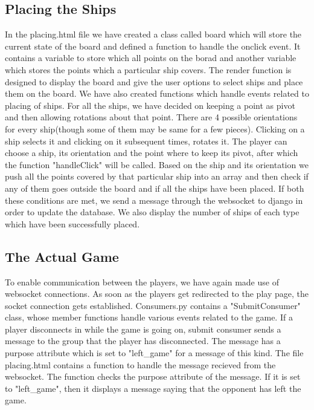 \documentclass[titlepage]{article}
\begin{document}
\subsection{Placing the Ships}
In the placing.html file we have created a class called board which will store the current state of the board and defined a function to handle the onclick event. It contains a variable to store which all points on the borad and another variable which stores the points which a particular ship covers. The render function is designed to display the board and give the user options to select ships and place them on the board. We have also created functions which handle events related to placing of ships. For all the ships, we have decided on keeping a point as pivot and then allowing rotations about that point. There are 4 possible orientations for every ship(though some of them may be same for a few pieces). Clicking on a ship selects it and clicking on it subsequent times, rotates it. The player can choose a ship, its orientation and the point where to keep its pivot, after which the function "handleClick" will be called. Based on the ship and its orientation we push all the points covered by that particular ship into an array and then check if any of them goes outside the board and if all the ships have been placed. If both these conditions are met, we send a message through the websocket to django in order to update the database. We also display the number of ships of each type which have been successfully placed.

\subsection{The Actual Game}
To enable communication between the players, we have again made use of websocket connections. As soon as the players get redirected to the play page, the socket connection gets established. Consumers.py contains a "SubmitConsumer" class, whose member functions handle various events related to the game. If a player disconnects in while the game is going on, submit consumer sends a message to the group that the player has disconnected. The message has a purpose attribute which is set to "left\_game" for a message of this kind. The file placing.html contains a function to handle the message recieved from the websocket. The function checks the purpose attribute of the message. If it is set to "left\_game", then it displays a message saying that the opponent has left the game.
\end{document}
